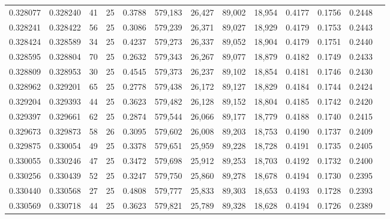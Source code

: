 \begin{tabular}{rrrrrrrrrrrrr}
0.328077 & 0.328240 &    41 &  25 &                                     0.3788 & 579,183 &  26,427 &  89,002 &  18,954 & 0.4177 & 0.1756 & 0.2448 \\
0.328241 & 0.328422 &    56 &  25 &                                     0.3086 & 579,239 &  26,371 &  89,027 &  18,929 & 0.4179 & 0.1753 & 0.2443 \\
0.328424 & 0.328589 &    34 &  25 &                                     0.4237 & 579,273 &  26,337 &  89,052 &  18,904 & 0.4179 & 0.1751 & 0.2440 \\
0.328595 & 0.328804 &    70 &  25 &                                     0.2632 & 579,343 &  26,267 &  89,077 &  18,879 & 0.4182 & 0.1749 & 0.2433 \\
0.328809 & 0.328953 &    30 &  25 &                                     0.4545 & 579,373 &  26,237 &  89,102 &  18,854 & 0.4181 & 0.1746 & 0.2430 \\
0.328962 & 0.329201 &    65 &  25 &                                     0.2778 & 579,438 &  26,172 &  89,127 &  18,829 & 0.4184 & 0.1744 & 0.2424 \\
0.329204 & 0.329393 &    44 &  25 &                                     0.3623 & 579,482 &  26,128 &  89,152 &  18,804 & 0.4185 & 0.1742 & 0.2420 \\
0.329397 & 0.329661 &    62 &  25 &                                     0.2874 & 579,544 &  26,066 &  89,177 &  18,779 & 0.4188 & 0.1740 & 0.2415 \\
0.329673 & 0.329873 &    58 &  26 &                                     0.3095 & 579,602 &  26,008 &  89,203 &  18,753 & 0.4190 & 0.1737 & 0.2409 \\
0.329875 & 0.330054 &    49 &  25 &                                     0.3378 & 579,651 &  25,959 &  89,228 &  18,728 & 0.4191 & 0.1735 & 0.2405 \\
0.330055 & 0.330246 &    47 &  25 &                                     0.3472 & 579,698 &  25,912 &  89,253 &  18,703 & 0.4192 & 0.1732 & 0.2400 \\
0.330256 & 0.330439 &    52 &  25 &                                     0.3247 & 579,750 &  25,860 &  89,278 &  18,678 & 0.4194 & 0.1730 & 0.2395 \\
0.330440 & 0.330568 &    27 &  25 &                                     0.4808 & 579,777 &  25,833 &  89,303 &  18,653 & 0.4193 & 0.1728 & 0.2393 \\
0.330569 & 0.330718 &    44 &  25 &                                     0.3623 & 579,821 &  25,789 &  89,328 &  18,628 & 0.4194 & 0.1726 & 0.2389 \\

\end{tabular}

